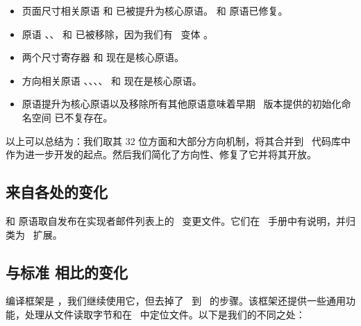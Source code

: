 \begin{itemize}
\item 页面尺寸相关原语  和  已被提升为核心原语。 和  原语已修复。

\item 原语 \type {\charwd}、\type {\charht}、\type {\chardp} 和 \type {\charit} 已被移除，因为我们有 \ETEX\ 变体 \type {\fontchar*}。

\item 两个尺寸寄存器  和  现在是核心原语。

\item 方向相关原语 、、、、 和  现在是核心原语。

\item 原语提升为核心原语以及移除所有其他原语意味着早期 \LUATEX\ 版本提供的初始化命名空间  已不复存在。

\end{itemize}

以上可以总结为：我们取其 32 位方面和大部分方向机制，将其合并到 \PDFTEX\ 代码库中作为进一步开发的起点。然后我们简化了方向性、修复了它并将其开放。

\subsection{来自各处的变化}

\type {\partokenname} 和 \type {\partokencontext} 原语取自发布在实现者邮件列表上的 \PDFTEX\ 变更文件。它们在 \PDFTEX\ 手册中有说明，并归类为 \ETEX\ 扩展。

\subsection{与标准 \WEBC 相比的变化}

\topicindex {\WEBC}

编译框架是 \WEBC，我们继续使用它，但去掉了 \PASCAL\ 到 \CCODE\ 的步骤。该框架还提供一些通用功能，处理从文件读取字节和在 \TDS\ 中定位文件。以下是我们的不同之处：

